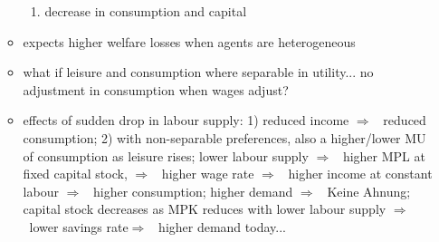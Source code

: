 \documentclass[12pt]{article}
\newcommand{\ar}{$\Rightarrow$ \ }
\begin{document}
\begin{itemize}
\begin{itemize}
\begin{enumerate}
\item decrease in consumption and capital 
\end{enumerate}
\item expects higher welfare losses when agents are heterogeneous
\item what if leisure and consumption where separable in utility... no adjustment in consumption when wages adjust?
\item effects of sudden drop in labour supply: 1) reduced income \ar reduced consumption; 2) with non-separable preferences, also a higher/lower MU of consumption as leisure rises;
lower labour supply \ar higher MPL at fixed capital stock, \ar higher wage rate \ar higher income at constant labour \ar higher consumption;
higher demand \ar Keine Ahnung;
capital stock decreases as MPK reduces with lower labour supply \ar lower savings rate\ar higher demand today... 
\end{itemize}
\end{itemize}
\end{document}
